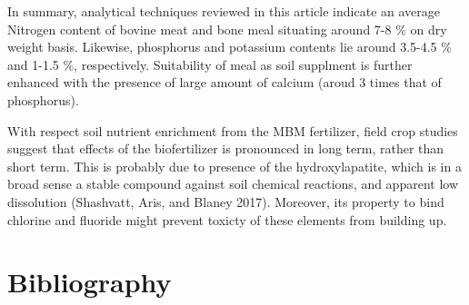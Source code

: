 \documentclass[
]{article}
\begin{document}
In summary, analytical techniques reviewed in this article indicate an average Nitrogen content of bovine meat and bone meal situating around 7-8 \% on dry weight basis. Likewise, phosphorus and potassium contents lie around 3.5-4.5 \% and 1-1.5 \%, respectively. Suitability of meal as soil supplment is further enhanced with the presence of large amount of calcium (aroud 3 times that of phosphorus).

With respect soil nutrient enrichment from the MBM fertilizer, field crop studies suggest that effects of the biofertilizer is pronounced in long term, rather than short term. This is probably due to presence of the hydroxylapatite, which is in a broad sense a stable compound against soil chemical reactions, and apparent low dissolution (Shashvatt, Aris, and Blaney 2017). Moreover, its property to bind chlorine and fluoride might prevent toxicty of these elements from building up.

\hypertarget{bibliography}{%
\section*{Bibliography}\label{bibliography}}
\end{document}
